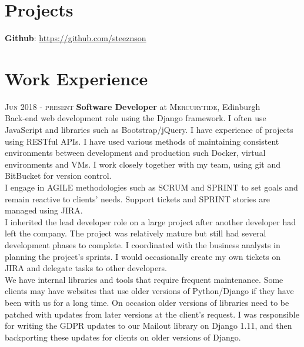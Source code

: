 \documentclass[14pt, a4paper]{extarticle}
\begin{document}
\begin{multicols}{2}
\section{Projects}
\noindent\textbf{Github}: \url{https://github.com/steeznson}

\columnbreak
\section{Work Experience}
\noindent\textsc{Jun 2018 - present} \textbf{Software Developer}
at \textsc{Mercurytide}, Edinburgh\\
Back-end web development role using the Django framework. I often use JavaScript and libraries such as Bootstrap/jQuery. I have experience of projects using RESTful APIs. I have used various methods of maintaining consistent environments between development and production such Docker, virtual environments and VMs. I work closely together with my team, using git and BitBucket for version control.\\
I engage in AGILE methodologies such as SCRUM and SPRINT to set goals and remain reactive to clients' needs. Support tickets and SPRINT stories are managed using JIRA.\\
I inherited the lead developer role on a large project after another developer had left the company. The project was relatively mature but still had several development phases to complete. I coordinated with the business analysts in planning the project's sprints. I would occasionally create my own tickets on JIRA and delegate tasks to other developers.\\
We have internal libraries and tools that require frequent maintenance. Some clients may have websites that use older versions of Python/Django if they have been with us for a long time. On occasion older versions of libraries need to be patched with updates from later versions at the client's request. I was responsible for writing the GDPR updates to our Mailout library on Django 1.11, and then backporting these updates for clients on older versions of Django.
\end{multicols}
\end{document}

